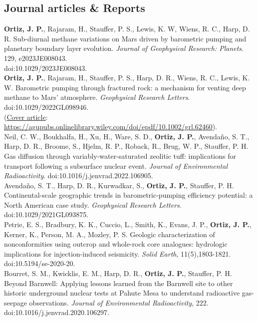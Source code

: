\documentclass[11pt, letterpaper]{article}
\newcommand{\years}[1]{\marginnote{\scriptsize #1}}
\begin{document}
\subsection*{Journal articles \& Reports}
\noindent
\years{2024}\textbf{Ortiz, J. P.}, Rajaram, H., Stauffer, P. S., Lewis, K. W,
Wiens, R. C., Harp, D. R.  Sub-diurnal methane variations on Mars driven by
barometric pumping and planetary boundary layer evolution.  \emph{Journal of
Geophysical Research: Planets}. 129, e2023JE008043.\\doi:10.1029/2023JE008043.\\ 
\years{2022}\textbf{Ortiz, J. P.}, Rajaram, H., Stauffer, P. S., Harp, D. R.,
Wiens, R. C., Lewis, K. W.  Barometric pumping through fractured rock: a
mechanism for venting deep methane to Mars' atmosphere.  \emph{Geophysical
Research Letters}. doi:10.1029/2022GL098946. \\(\underline{Cover article}:
\href{https://agupubs.onlinelibrary.wiley.com/doi/epdf/10.1002/grl.62460}{https://agupubs.onlinelibrary.wiley.com/doi/epdf/10.1002/grl.62460}).\\ 
\years{2022}Neil, C. W., Boukhalfa, H., Xu, H., Ware, S. D., \textbf{Ortiz, J.
P.}, Avendaño, S. T., Harp, D. R., Broome, S., Hjelm, R. P., Roback, R., Brug,
W. P., Stauffer, P. H. Gas diffusion through variably-water-saturated zeolitic
tuff: implications for transport following a subsurface nuclear event.
\emph{Journal of Environmental Radioactivity}.
doi:10.1016/j.jenvrad.2022.106905.\\
\years{2021}Avendaño, S. T., Harp, D. R., Kurwadkar, S., \textbf{Ortiz, J.
P.}, Stauffer, P. H. Continental-scale geographic trends in barometric-pumping
efficiency potential: a North American case study.
\emph{Geophysical Research Letters}.  doi:10.1029/2021GL093875.\\
\years{2020}Petrie, E. S., Bradbury, K. K., Cuccio, L., Smith, K., Evans, J.
P., \textbf{Ortiz, J. P.}, Kerner, K., Person, M. A., Mozley, P. S.
Geologic characterization of nonconformities using outcrop and whole-rock core
analogues: hydrologic implications for injection-induced seismicity.
\emph{Solid Earth}, 11(5),1803-1821. doi:10.5194/se-2020-20.\\
\years{2020}Bourret, S. M., Kwicklis, E. M., Harp, D. R., \textbf{Ortiz, J.
P.}, Stauffer, P. H. Beyond Barnwell: Applying lessons learned from the
Barnwell site to other historic underground nuclear tests at Pahute Mesa to
understand radioactive gas-seepage observations. \emph{Journal of Environmental
Radioactivity}, 222. doi:10.1016/j.jenvrad.2020.106297.\\
\end{document}
